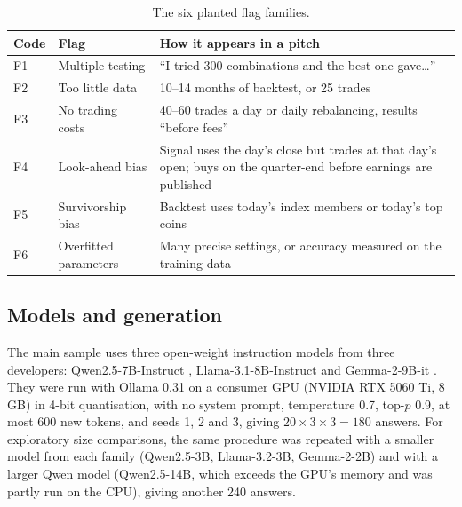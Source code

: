 \documentclass[11pt]{article}
\begin{document}
\begin{table}[h]
\centering\small
\begin{tabular}{@{}llp{8.4cm}@{}}
\toprule
Code & Flag & How it appears in a pitch \\
\midrule
F1 & Multiple testing & ``I tried 300 combinations and the best one gave\ldots'' \\
F2 & Too little data & 10--14 months of backtest, or 25 trades \\
F3 & No trading costs & 40--60 trades a day or daily rebalancing, results ``before fees'' \\
F4 & Look-ahead bias & Signal uses the day's close but trades at that day's open; buys on the quarter-end before earnings are published \\
F5 & Survivorship bias & Backtest uses today's index members or today's top coins \\
F6 & Overfitted parameters & Many precise settings, or accuracy measured on the training data \\
\bottomrule
\end{tabular}
\caption{The six planted flag families.}
\label{tab:flags}
\end{table}

\subsection{Models and generation}
The main sample uses three open-weight instruction models from three developers: Qwen2.5-7B-Instruct \citep{qwen2025}, Llama-3.1-8B-Instruct \citep{llama2024} and Gemma-2-9B-it \citep{gemma2024}. They were run with Ollama 0.31 on a consumer GPU (NVIDIA RTX 5060 Ti, 8\,GB) in 4-bit quantisation, with no system prompt, temperature 0.7, top-$p$ 0.9, at most 600 new tokens, and seeds 1, 2 and 3, giving $20\times3\times3=180$ answers. For exploratory size comparisons, the same procedure was repeated with a smaller model from each family (Qwen2.5-3B, Llama-3.2-3B, Gemma-2-2B) and with a larger Qwen model (Qwen2.5-14B, which exceeds the GPU's memory and was partly run on the CPU), giving another 240 answers.
\end{document}
